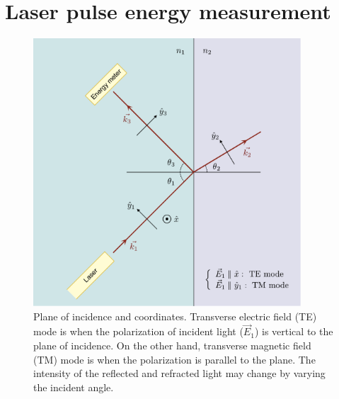 
\chapter{Laser pulse energy measurement}
\label{sec:ap5}

\begin{figure}[ht!]
\centering
\includegraphics[width=100mm]{figures/ap5/Fresnel/Fresnel.pdf}
\caption{Plane of incidence and coordinates. Transverse electric field (TE) mode is when the polarization of incident light ($\vec{E}_1$) is vertical to the plane of incidence. On the other hand, transverse magnetic field (TM) mode is when the polarization is parallel to the plane. The intensity of the reflected and refracted light may change by varying the incident angle.}
\label{fig:Fresnel}
\end{figure}

